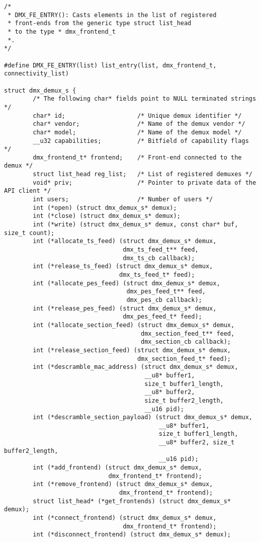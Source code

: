 \begin{verbatim}
/* 
 * DMX_FE_ENTRY(): Casts elements in the list of registered 
 * front-ends from the generic type struct list_head
 * to the type * dmx_frontend_t
 *. 
*/

#define DMX_FE_ENTRY(list) list_entry(list, dmx_frontend_t, connectivity_list) 

struct dmx_demux_s { 
        /* The following char* fields point to NULL terminated strings */ 
        char* id;                    /* Unique demux identifier */ 
        char* vendor;                /* Name of the demux vendor */ 
        char* model;                 /* Name of the demux model */ 
        __u32 capabilities;          /* Bitfield of capability flags */ 
        dmx_frontend_t* frontend;    /* Front-end connected to the demux */ 
        struct list_head reg_list;   /* List of registered demuxes */
        void* priv;                  /* Pointer to private data of the API client */ 
        int users;                   /* Number of users */
        int (*open) (struct dmx_demux_s* demux); 
        int (*close) (struct dmx_demux_s* demux); 
        int (*write) (struct dmx_demux_s* demux, const char* buf, size_t count); 
        int (*allocate_ts_feed) (struct dmx_demux_s* demux, 
                                 dmx_ts_feed_t** feed, 
                                 dmx_ts_cb callback); 
        int (*release_ts_feed) (struct dmx_demux_s* demux, 
                                dmx_ts_feed_t* feed); 
        int (*allocate_pes_feed) (struct dmx_demux_s* demux, 
                                  dmx_pes_feed_t** feed, 
                                  dmx_pes_cb callback); 
        int (*release_pes_feed) (struct dmx_demux_s* demux, 
                                 dmx_pes_feed_t* feed); 
        int (*allocate_section_feed) (struct dmx_demux_s* demux, 
                                      dmx_section_feed_t** feed, 
                                      dmx_section_cb callback); 
        int (*release_section_feed) (struct dmx_demux_s* demux,
                                     dmx_section_feed_t* feed); 
        int (*descramble_mac_address) (struct dmx_demux_s* demux, 
                                       __u8* buffer1, 
                                       size_t buffer1_length, 
                                       __u8* buffer2, 
                                       size_t buffer2_length,
                                       __u16 pid); 
        int (*descramble_section_payload) (struct dmx_demux_s* demux,
                                           __u8* buffer1, 
                                           size_t buffer1_length,
                                           __u8* buffer2, size_t buffer2_length,
                                           __u16 pid); 
        int (*add_frontend) (struct dmx_demux_s* demux, 
                             dmx_frontend_t* frontend); 
        int (*remove_frontend) (struct dmx_demux_s* demux,
                                dmx_frontend_t* frontend); 
        struct list_head* (*get_frontends) (struct dmx_demux_s* demux); 
        int (*connect_frontend) (struct dmx_demux_s* demux, 
                                 dmx_frontend_t* frontend); 
        int (*disconnect_frontend) (struct dmx_demux_s* demux); 


\end{verbatim}
